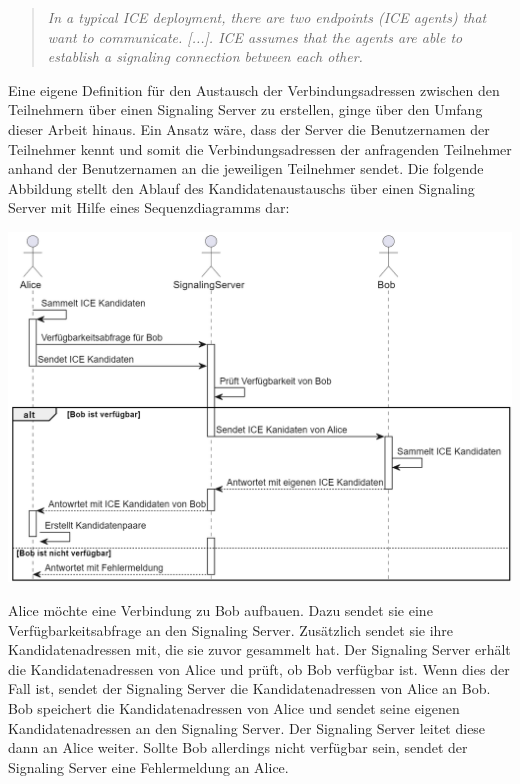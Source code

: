 \begin{quote}
    \textit{In a typical ICE deployment, there are two endpoints (ICE agents)
    that want to communicate. [...]. ICE assumes that the agents are able to
    establish a signaling connection between each other.} \parencite[S. 7]{rfc8445_ICE}
\end{quote}

\noindent Eine eigene Definition für den Austausch der Verbindungsadressen zwischen den Teilnehmern über einen Signaling Server zu erstellen, ginge über den Umfang dieser Arbeit hinaus. Ein Ansatz wäre, dass der Server die Benutzernamen der Teilnehmer kennt und somit die Verbindungsadressen der anfragenden Teilnehmer anhand der Benutzernamen an die jeweiligen Teilnehmer sendet. Die folgende Abbildung stellt den Ablauf des Kandidatenaustauschs über einen Signaling Server mit Hilfe eines Sequenzdiagramms dar:

\begin{center}
    \captionsetup{type=figure}
    \includegraphics[width=1.0\linewidth]{images/signaling_sequence.png}
    \label{fig:signaling_server}
\end{center}

\noindent Alice möchte eine Verbindung zu Bob aufbauen. Dazu sendet sie eine Verfügbarkeitsabfrage an den Signaling Server. Zusätzlich sendet sie ihre Kandidatenadressen mit, die sie zuvor gesammelt hat. Der Signaling Server erhält die Kandidatenadressen von Alice und prüft, ob Bob verfügbar ist. Wenn dies der Fall ist, sendet der Signaling Server die Kandidatenadressen von Alice an Bob. Bob speichert die Kandidatenadressen von Alice und sendet seine eigenen Kandidatenadressen an den Signaling Server. Der Signaling Server leitet diese dann an Alice weiter. Sollte Bob allerdings nicht verfügbar sein, sendet der Signaling Server eine Fehlermeldung an Alice. 

